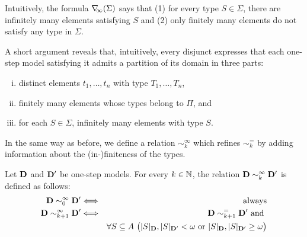 Intuitively, the formula $\nabla_{\!\!\infty}(\Sigma)$ says that (1) for every type $S\in\Sigma$, there are infinitely many elements satisfying $S$ and (2) only finitely many elements do not satisfy any type in $\Sigma$.

A short argument reveals that, intuitively, every disjunct expresses that each one-step model satisfying it admits a partition of its domain in three parts:
\begin{enumerate}[(i)]
 pt
\item distinct elements $t_1,\dots,t_n$ with type $T_1,\dots,T_n$,
\item finitely many elements whose types belong to $\Pi$, and
\item for each $S\in \Sigma$, infinitely many elements with type $S$.
\end{enumerate}

In the same way as before, we define a relation $\sim^\infty_k$ which refines $\sim^=_{k}$ by adding information about the (in-)finiteness of the types.

\begin{definition}
	Let $\mathbf{D}$ and $\mathbf{D}'$ be one-step models. For every $k\in\mathbb{N}$, the relation $\mathbf{D} \sim^\infty_k \mathbf{D}'$ is defined as follows:
\begin{eqnarray*}
	\osmodel \sim^\infty_0 \osmodel' & \Longleftrightarrow & \text{always}\\
	\osmodel \sim^\infty_{k+1} \osmodel' & \Longleftrightarrow & \osmodel \sim^=_{k+1} \osmodel' \text{ and }\\
	&& \forall S\subseteq A \ \big(
	|S|_\osmodel,|S|_{\osmodel'} < \omega \text{ or } |S|_\osmodel,|S|_{\osmodel'} \geq \omega \big)%
\end{eqnarray*}
\end{definition}

